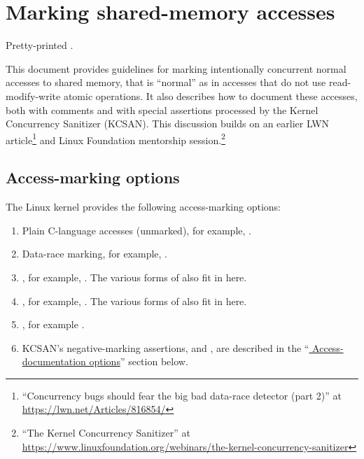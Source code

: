 \section{Marking shared-memory accesses}
\label{sec:docs:Marking shared-memory accesses}

\begin{Note}
  Pretty-printed .
\end{Note}

This document provides guidelines for marking intentionally concurrent
normal accesses to shared memory, that is ``normal'' as in accesses that do
not use read-modify-write atomic operations.
It also describes how to document these accesses, both with comments and
with special assertions processed by the Kernel Concurrency Sanitizer (KCSAN).
This discussion builds on an earlier LWN article\footnote{
``Concurrency bugs should fear the big bad data-race detector (part 2)'' at
\url{https://lwn.net/Articles/816854/}
} and Linux Foundation mentorship session.\footnote{
``The Kernel Concurrency Sanitizer'' at
\url{https://www.linuxfoundation.org/webinars/the-kernel-concurrency-sanitizer}
}

\subsection{Access-marking options}

The Linux kernel provides the following access-marking options:

\begin{enumerate}[1:\@]
\item	Plain C-language accesses (unmarked), for example, .
	\label{enum:marking:plain}

\item	Data-race marking, for example, .
	\label{enum:marking:data_race}

\item	{}, for example, .
	The various forms of  also fit in here.
        \label{enum:marking:READ_ONCE}

\item	{}, for example, .
	The various forms of  also fit in here.
        \label{enum:marking:WRITE_ONCE}

\item	{}, for example .

\item	KCSAN's negative-marking assertions, 
	and , are described in the
	``\hyperref[sec:docs:access-marking:Access-documentation options]{
	  Access-documentation options}''
	section below.
\end{enumerate}

